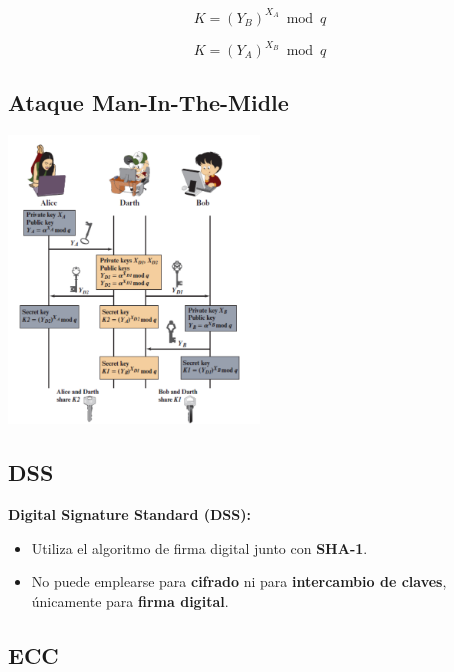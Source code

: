 \documentclass[11pt,a4paper]{article}
\begin{document}
\begin{tcolorbox}[colback=gray!05,colframe=black,title=\textbf{Generation of Secret Key by User A}]
\[
K = (Y_B)^{X_A} \bmod q
\]
\end{tcolorbox}

\begin{tcolorbox}[colback=gray!05,colframe=black,title=\textbf{Generation of Secret Key by User B}]
\[
K = (Y_A)^{X_B} \bmod q
\]
\end{tcolorbox}

\subsection*{Ataque Man-In-The-Midle}
\begin{center}
    \includegraphics[width=0.5\textwidth]{resources/MITM-Diffie-Hellman.png}
\end{center}

\subsection{DSS}

\textbf{Digital Signature Standard (DSS):}
\begin{itemize}
    \item Utiliza el algoritmo de firma digital junto con \textbf{SHA-1}.
    \item No puede emplearse para \textbf{cifrado} ni para \textbf{intercambio de claves}, únicamente para \textbf{firma digital}.
\end{itemize}

\subsection{ECC}
\end{document}
